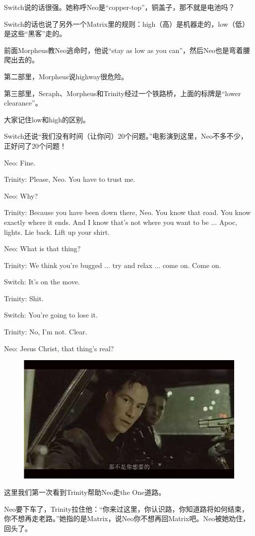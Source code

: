 \documentclass[UTF8]{ctexart}
\newenvironment{myquote}{\color{green} \setlength{\leftskip}{6em} \setlength{\rightskip}{4em} \setlength{\parindent}{-2em}}{\par}
\begin{document}
Switch说的话很强。她称呼Neo是“copper-top”，铜盖子，那不就是电池吗？

Switch的话也说了另外一个Matrix里的规则：high（高）是机器走的，low（低）是这些“黑客”走的。

前面Morpheus教Neo逃命时，他说“stay as low as you can”，然后Neo也是弯着腰爬出去的。

第二部里，Morpheus说highway很危险。

第三部里，Seraph、Morpheus和Trinity经过一个铁路桥，上面的标牌是“lower clearance”。

大家记住low和high的区别。

Switch还说“我们没有时间（让你问）20个问题。”电影演到这里，Neo不多不少，正好问了20个问题！

\begin{myquote}
Neo: Fine.

Trinity: Please, Neo. You have to trust me.

Neo: Why?

Trinity: Because you have been down there, Neo. You know that road. You know exactly where it ends. And I know that's not where you want to be ... Apoc, lights. Lie back. Lift up your shirt.

Neo: What is that thing?

Trinity: We think you're bugged ... try and relax ... come on. Come on.

Switch: It's on the move.

Trinity: Shit.

Switch: You're going to lose it.

Trinity: No, I'm not. Clear.

Neo: Jesus Christ, that thing's real?
\end{myquote}

\begin{figure}[htb]
\centering
\includegraphics[width=0.5\linewidth]{fig/read_Matrix-17}
\end{figure}

这里我们第一次看到Trinity帮助Neo走the One道路。

Neo要下车了，Trinity拉住他：“你来过这里，你认识路，你知道路将如何结束，你不想再走老路。”她指的是Matrix，说Neo你不想再回Matrix吧。Neo被她劝住，回头了。
\end{document}
